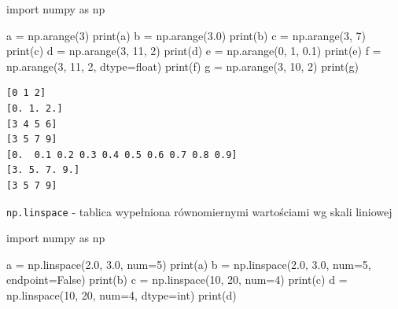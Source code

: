 \documentclass[
  letterpaper,
  DIV=11,
  numbers=noendperiod]{scrreprt}
\newenvironment{Shaded}{\begin{snugshade}}{\end{snugshade}}
\newcommand{\BuiltInTok}[1]{\textcolor[rgb]{0.00,0.23,0.31}{#1}}
\newcommand{\DecValTok}[1]{\textcolor[rgb]{0.68,0.00,0.00}{#1}}
\newcommand{\FloatTok}[1]{\textcolor[rgb]{0.68,0.00,0.00}{#1}}
\newcommand{\ImportTok}[1]{\textcolor[rgb]{0.00,0.46,0.62}{#1}}
\newcommand{\NormalTok}[1]{\textcolor[rgb]{0.00,0.23,0.31}{#1}}
\newcommand{\OperatorTok}[1]{\textcolor[rgb]{0.37,0.37,0.37}{#1}}
\newcommand{\VariableTok}[1]{\textcolor[rgb]{0.07,0.07,0.07}{#1}}
\begin{document}
\begin{Shaded}
\begin{Highlighting}[]
\ImportTok{import}\NormalTok{ numpy }\ImportTok{as}\NormalTok{ np}

\NormalTok{a }\OperatorTok{=}\NormalTok{ np.arange(}\DecValTok{3}\NormalTok{)}
\BuiltInTok{print}\NormalTok{(a)}
\NormalTok{b }\OperatorTok{=}\NormalTok{ np.arange(}\FloatTok{3.0}\NormalTok{)}
\BuiltInTok{print}\NormalTok{(b)}
\NormalTok{c }\OperatorTok{=}\NormalTok{ np.arange(}\DecValTok{3}\NormalTok{, }\DecValTok{7}\NormalTok{)}
\BuiltInTok{print}\NormalTok{(c)}
\NormalTok{d }\OperatorTok{=}\NormalTok{ np.arange(}\DecValTok{3}\NormalTok{, }\DecValTok{11}\NormalTok{, }\DecValTok{2}\NormalTok{)}
\BuiltInTok{print}\NormalTok{(d)}
\NormalTok{e }\OperatorTok{=}\NormalTok{ np.arange(}\DecValTok{0}\NormalTok{, }\DecValTok{1}\NormalTok{, }\FloatTok{0.1}\NormalTok{)}
\BuiltInTok{print}\NormalTok{(e)}
\NormalTok{f }\OperatorTok{=}\NormalTok{ np.arange(}\DecValTok{3}\NormalTok{, }\DecValTok{11}\NormalTok{, }\DecValTok{2}\NormalTok{, dtype}\OperatorTok{=}\BuiltInTok{float}\NormalTok{)}
\BuiltInTok{print}\NormalTok{(f)}
\NormalTok{g }\OperatorTok{=}\NormalTok{ np.arange(}\DecValTok{3}\NormalTok{, }\DecValTok{10}\NormalTok{, }\DecValTok{2}\NormalTok{)}
\BuiltInTok{print}\NormalTok{(g)}
\end{Highlighting}
\end{Shaded}

\begin{verbatim}
[0 1 2]
[0. 1. 2.]
[3 4 5 6]
[3 5 7 9]
[0.  0.1 0.2 0.3 0.4 0.5 0.6 0.7 0.8 0.9]
[3. 5. 7. 9.]
[3 5 7 9]
\end{verbatim}

\texttt{np.linspace} - tablica wypełniona równomiernymi wartościami wg
skali liniowej

\begin{Shaded}
\begin{Highlighting}[]
\ImportTok{import}\NormalTok{ numpy }\ImportTok{as}\NormalTok{ np}

\NormalTok{a }\OperatorTok{=}\NormalTok{ np.linspace(}\FloatTok{2.0}\NormalTok{, }\FloatTok{3.0}\NormalTok{, num}\OperatorTok{=}\DecValTok{5}\NormalTok{)}
\BuiltInTok{print}\NormalTok{(a)}
\NormalTok{b }\OperatorTok{=}\NormalTok{ np.linspace(}\FloatTok{2.0}\NormalTok{, }\FloatTok{3.0}\NormalTok{, num}\OperatorTok{=}\DecValTok{5}\NormalTok{, endpoint}\OperatorTok{=}\VariableTok{False}\NormalTok{)}
\BuiltInTok{print}\NormalTok{(b)}
\NormalTok{c }\OperatorTok{=}\NormalTok{ np.linspace(}\DecValTok{10}\NormalTok{, }\DecValTok{20}\NormalTok{, num}\OperatorTok{=}\DecValTok{4}\NormalTok{)}
\BuiltInTok{print}\NormalTok{(c)}
\NormalTok{d }\OperatorTok{=}\NormalTok{ np.linspace(}\DecValTok{10}\NormalTok{, }\DecValTok{20}\NormalTok{, num}\OperatorTok{=}\DecValTok{4}\NormalTok{, dtype}\OperatorTok{=}\BuiltInTok{int}\NormalTok{)}
\BuiltInTok{print}\NormalTok{(d)}
\end{Highlighting}
\end{Shaded}
\end{document}
